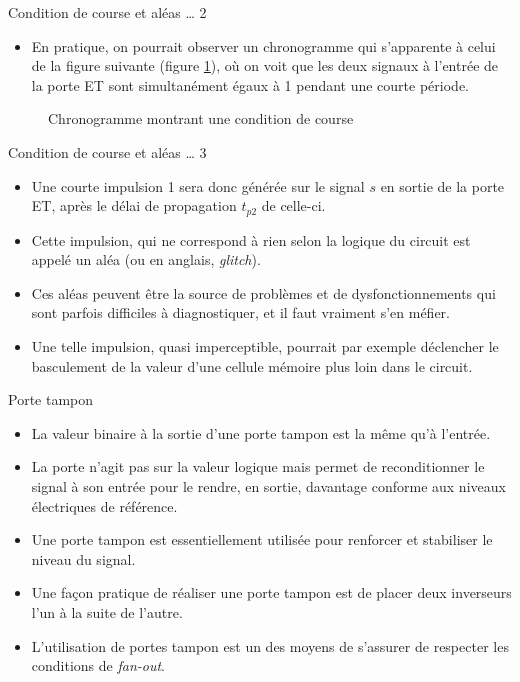 \documentclass[presentation]{beamer}
\begin{document}
\begin{frame}[label={sec:org337fdb8}]{Condition de course et aléas \ldots{} 2}
\begin{itemize}
\item En pratique, on pourrait observer un chronogramme qui s'apparente à celui de la figure suivante (figure \ref{fig:orgef6e60e}), où on voit que les deux signaux à l'entrée de la porte ET sont simultanément égaux à 1 pendant une courte période.
\end{itemize}


\begin{figure}[htbp]
\centering

\caption{\label{fig:orgef6e60e}Chronogramme montrant une condition de course}
\end{figure}
\end{frame}
\begin{frame}[label={sec:orgdcad15f}]{Condition de course et aléas \ldots{} 3}
\begin{itemize}
\item Une courte impulsion 1 sera donc générée sur le signal \(s\) en sortie de la porte ET, après le délai de propagation \(t_{p2}\) de celle-ci.

\item Cette impulsion, qui ne correspond à rien selon la logique du circuit est appelé un \alert{aléa} (ou en anglais, \emph{glitch}).

\item Ces aléas peuvent être la source de problèmes et de dysfonctionnements qui sont parfois difficiles à diagnostiquer, et il faut vraiment s'en méfier.

\item Une telle impulsion, quasi imperceptible, pourrait par exemple déclencher le basculement de la valeur d'une cellule mémoire plus loin dans le circuit.
\end{itemize}
\end{frame}

\begin{frame}[label={sec:org3f949b5}]{Porte tampon}
\begin{itemize}
\item La valeur binaire à la sortie d'une porte tampon est la même qu'à l'entrée.

\item La porte n'agit pas sur la valeur logique mais permet de reconditionner le signal à son entrée pour le rendre, en sortie, davantage conforme aux niveaux électriques de référence.

\item Une porte tampon est essentiellement utilisée pour renforcer et stabiliser le niveau du signal.

\item Une façon pratique de réaliser une porte tampon est de placer deux inverseurs l'un à la suite de l'autre.

\item L'utilisation de portes tampon est un des moyens de s'assurer de respecter les conditions de \emph{fan-out}.
\end{itemize}
\end{frame}
\end{document}
